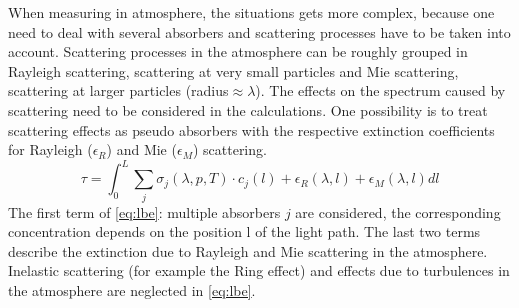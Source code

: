 \documentclass  [
  paper    = a4,
  BCOR     = 10mm,
  twoside,
  fontsize = 12pt,
  fleqn,
  toc      = bibnumbered,
  toc      = listofnumbered,
  numbers  = noendperiod,
  headings = normal,
  listof   = leveldown,
  version  = 3.03
]                                       {scrreprt}
\begin{document}
	When measuring in atmosphere, the situations gets more complex, because one need to deal with several absorbers and scattering processes have to be taken into account. 
	Scattering processes in the atmosphere can be roughly grouped in Rayleigh scattering, scattering at very small particles and Mie scattering, scattering at larger particles (radius$\approx \lambda$). The effects on the spectrum caused by scattering need to be considered in the calculations.  One possibility is to treat scattering effects as pseudo absorbers with the respective extinction coefficients for Rayleigh ($\epsilon_R$) and  Mie ($\epsilon_M$) scattering. 
	\begin{equation}
	\tau = \int^{L}_{0}\sum_{j}\sigma_{j}\left(\lambda,p,T\right)\cdot
	c_{j}\left(l\right)+\epsilon_R\left(\lambda,l\right)+\epsilon_{M}\left(\lambda,l\right)dl
	\label{eq:lbe}
	\end{equation}
	The first term of \cref{eq:lbe}: multiple absorbers $j$ are considered, the corresponding concentration depends on the position l of the light path.
	The last two terms describe the extinction due to Rayleigh and Mie scattering in the atmosphere.\\
	Inelastic scattering (for example the Ring effect) and effects due to turbulences in the atmosphere are neglected in \cref{eq:lbe}. 
\end{document}
